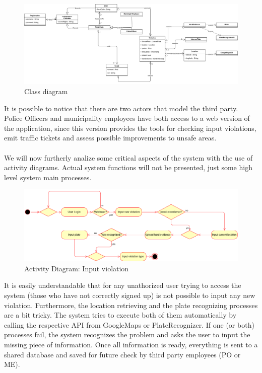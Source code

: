 \documentclass{article}
\begin{document}
\begin{figure}[H]
    \centering
    \includegraphics[scale=0.255]{Images/umlmodel}
    \caption{Class diagram}
\end{figure}

It is possible to notice that there are two actors that model the third party.
Police Officers and municipality employees have both access to a web version of
the application, since this version provides the tools for checking input
violations, emit traffic tickets and assess possible improvements to unsafe areas.\\
\\
We will now furtherly analize some critical aspects of the system with the use
of activity diagrams. Actual system functions will not be presented, just some
high level system main processes.

\begin{figure}[H]
    \centering
    \includegraphics[scale=0.36]{Images/ActivityInputViolation}
    \caption{Activity Diagram: Input violation}
\end{figure}

It is easily understandable that for any unathorized user trying to access the
system (those who have not correctly signed up) is not possible to input any new
violation. Furthermore, the location retrieving and the plate recognizing
processes are a bit tricky. The system tries to execute both of them
automatically by calling the respective API from GoogleMaps or PlateRecognizer.
If one (or both) processes fail, the system recognizes the problem and asks the
user to input the missing piece of information. Once all information is ready,
everything is sent to a shared database and saved for future check by third
party employees (PO or ME). 
\end{document}
